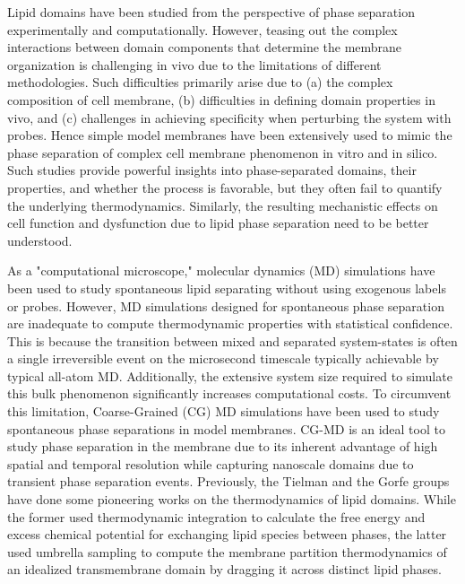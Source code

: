 \documentclass{biophys-new}
\begin{document}
Lipid domains have been studied from the perspective of phase separation experimentally and computationally.
However, teasing out the complex interactions between domain components that determine the membrane organization is challenging in vivo due to the limitations of different methodologies\cite{Klotzsch2013}.
Such difficulties primarily arise due to (a) the complex composition of cell membrane\cite{Tieleman2019}, (b) difficulties in defining domain properties in vivo\cite{Sezgin2017}, and (c) challenges in achieving specificity when perturbing the system with probes\cite{Veatch2007}.
Hence simple model membranes have been extensively used to mimic the phase separation of complex cell membrane phenomenon in vitro\cite{Veatch2003a}\cite{Veatch2002}\cite{Veatch2003} and in silico\cite{Risselada2008}\cite{Lin2016}\cite{Lin2019}.
Such studies provide powerful insights into phase-separated domains, their properties, and whether the process is favorable, but they often fail to quantify the underlying thermodynamics.
Similarly, the resulting mechanistic effects on cell function and dysfunction due to lipid phase separation need to be better understood.

As a "computational microscope\cite{Dror2012}," molecular dynamics (MD) simulations have been used to study spontaneous lipid separating without using exogenous labels or probes\cite{Pantelopulos2018}.
However, MD simulations designed for spontaneous phase separation are inadequate to compute thermodynamic properties with statistical confidence.
This is because the transition between mixed and separated system-states is often a single irreversible event on the microsecond timescale typically achievable by typical all-atom MD.
Additionally, the extensive system size required to simulate this bulk phenomenon significantly increases computational costs.
To circumvent this limitation, Coarse-Grained (CG) MD simulations have been used to study spontaneous phase separations in model membranes\cite{Risselada2008}\cite{Bennett2018}.
CG-MD is an ideal tool to study phase separation in the membrane due to its inherent advantage of high spatial and temporal resolution while capturing nanoscale domains due to transient phase separation events.
Previously, the Tielman\cite{Bennett2018} and the Gorfe groups\cite{Lin2019} have done some pioneering works on the thermodynamics of lipid domains.
While the former used thermodynamic integration\cite{Salsburg1953} to calculate the free energy and excess chemical potential for exchanging lipid species between phases, the latter used umbrella sampling\cite{TorrieG.MValleau1977} to compute the membrane partition thermodynamics of an idealized transmembrane domain by dragging it across distinct lipid phases.
\end{document}
